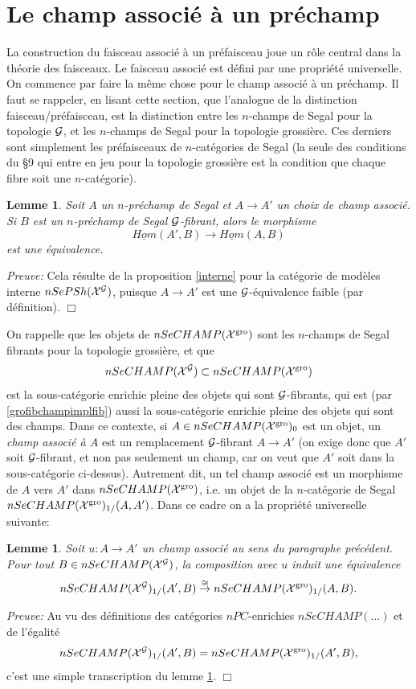 \documentclass[12pt]{article}
\newcommand{\numero}[1]{\newpage\section{#1}}
\newcommand{\eop}{\hfill $\Box$\vspace{.1in}}
\newtheorem{lemme}[lemma]{Lemme}
\newcommand{\Gg}{{\cal G}}
\newcommand{\Xx}{{\cal X}}
\begin{document}
\numero{Le champ associ\'e \`a un pr\'echamp}

\label{associepage}

La construction du faisceau associ\'e \`a un
pr\'efaisceau joue un r\^ole central dans la th\'eorie des faisceaux.
Le faisceau associ\'e est d\'efini par une propri\'et\'e universelle.
On commence par faire la m\^eme chose pour le champ associ\'e \`a un pr\'echamp.
Il faut se rappeler,
en lisant cette section, que l'analogue de la distinction
faisceau/pr\'efaisceau, est la distinction entre les $n$-champs de Segal pour la
topologie $\Gg$, et les $n$-champs de Segal pour la topologie grossi\`ere.
Ces derniers sont
simplement les pr\'efaisceaux de $n$-cat\'egories de Segal (la seule
des conditions du \S 9 qui entre en jeu pour la topologie
grossi\`ere est la condition que chaque fibre soit une $n$-cat\'egorie).

\begin{lemme}
\label{propuniv1}
Soit $A$ un $n$-pr\'echamp de Segal et $A\rightarrow A'$ un choix de champ
associ\'e. Si $B$ est un $n$-pr\'echamp de Segal $\Gg$-fibrant, alors le
morphisme
$$
\underline{Hom}(A', B)\rightarrow \underline{Hom}(A,B)
$$
est une \'equivalence.
\end{lemme}
{\em Preuve:} Cela r\'esulte
de la proposition \ref{interne} pour la cat\'egorie de
mod\`eles interne \newline
$nSePSh(\Xx ^{\Gg})$, puisque
$A\rightarrow A'$ est une $\Gg$-\'equivalence faible (par d\'efinition).
\eop

On rappelle que les objets de $nSeCHAMP (\Xx ^{\rm gro})$
sont les $n$-champs de Segal
fibrants pour la topologie grossi\`ere, et que
$$
nSeCHAMP (\Xx ^{\Gg })\subset nSeCHAMP (\Xx ^{\rm gro})
$$
est la sous-cat\'egorie enrichie pleine des objets qui sont $\Gg$-fibrants,
qui est
(par \ref{grofibchampimplfib}) aussi la sous-cat\'egorie enrichie pleine
des objets
qui sont des champs. Dans ce contexte,
si $A\in nSeCHAMP (\Xx ^{\rm gro})_0$ est un objet,
un {\em champ associ\'e \`a $A$} est un
remplacement $\Gg$-fibrant $A\rightarrow A'$ (on exige donc que $A'$ soit
$\Gg$-fibrant, et non pas seulement un champ, car on veut que $A'$ soit dans
la sous-cat\'egorie ci-dessus).
Autrement dit, un tel champ associ\'e
est un morphisme de $A$ vers $A'$ dans
$nSeCHAMP (\Xx ^{\rm gro})$, i.e. un objet de la $n$-cat\'egorie de
Segal $nSeCHAMP (\Xx ^{\rm gro})_{1/}(A,A')$.
Dans ce cadre on a la propri\'et\'e universelle suivante:

\begin{lemme}
\label{propuniv2}
Soit $u:A\rightarrow A'$ un champ associ\'e au sens du paragraphe
pr\'ec\'edent.
Pour tout $B\in nSeCHAMP (\Xx ^{\Gg})$, la composition avec
$u$ induit une \'equivalence
$$
nSeCHAMP (\Xx ^{\Gg})_{1/}(A',B)
\stackrel{\cong}{\rightarrow}
nSeCHAMP (\Xx ^{\rm gro})_{1/}(A,B).
$$
\end{lemme}
{\em Preuve:}
Au vu des d\'efinitions des
cat\'egories $nPC$-enrichies $nSeCHAMP(\ldots )$
et de l'\'egalit\'e
$$
nSeCHAMP (\Xx ^{\Gg})_{1/}(A',B)=
nSeCHAMP (\Xx ^{\rm gro})_{1/}(A',B),
$$
c'est une simple transcription du lemme \ref{propuniv1}.
\eop
\end{document}
